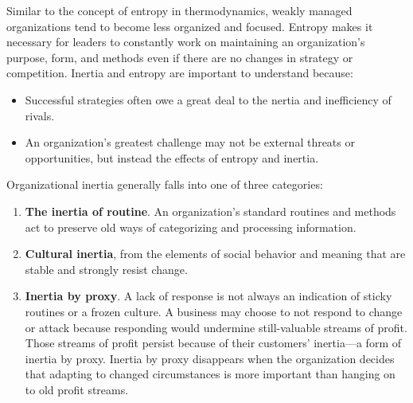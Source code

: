 \documentclass{article}
\newenvironment{nosepitemize}
{ \begin{itemize}
    \setlength{\itemsep}{0pt}
    \setlength{\parskip}{0pt}
    \setlength{\parsep}{0pt}     }
{ \end{itemize}                  }
\newenvironment{nosepenumerate}
{ \begin{enumerate}
    \setlength{\itemsep}{0pt}
    \setlength{\parskip}{0pt}
    \setlength{\parsep}{0pt}     }
{ \end{enumerate}                  }
\begin{document}
\begin{multicols}{2}
Similar to the concept of entropy in thermodynamics, weakly managed organizations tend to become less organized and focused. Entropy makes it necessary for leaders to constantly work on maintaining an organization’s purpose, form, and methods even if there are no changes in strategy or competition. Inertia and entropy are important to understand because:

\begin{nosepitemize}
    \item Successful strategies often owe a great deal to the nertia and inefficiency of rivals.
    \item An organization’s greatest challenge may not be external threats or opportunities, but instead the effects of entropy and inertia.
\end{nosepitemize}

Organizational inertia generally falls into one of three categories:

\begin{nosepenumerate}
    \item \textbf{The inertia of routine}. An organization’s standard routines and methods act to preserve old ways of categorizing and processing information.
    \item \textbf{Cultural inertia}, from the elements of social behavior and meaning that are stable and strongly resist change.
    \item \textbf{Inertia by proxy}. A lack of response is not always an indication of sticky routines or a frozen culture. A business may choose to not respond to change or attack because responding would undermine still-valuable streams of profit. Those streams of profit persist because of their customers’ inertia—a form of inertia by proxy. Inertia by proxy disappears when the organization decides that adapting to changed circumstances is more important than hanging on to old profit streams.
\end{nosepenumerate}

\end{multicols}
\end{document}
